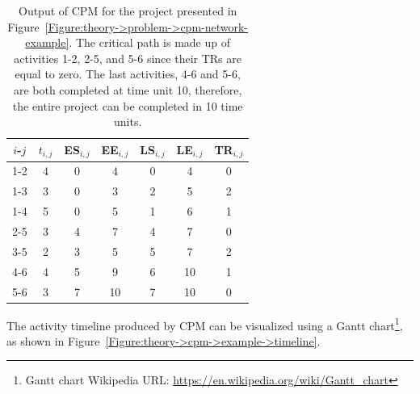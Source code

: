 \begin{table}[ht]
	\centering
	\begin{tabular}{|c|c|c|c|c|c|c|}
		\hline
		$i$-$j$ & $t_{i, j}$ & ES$_{i, j}$ & EE$_{i, j}$ & LS$_{i, j}$ & LE$_{i, j}$ & TR$_{i, j}$ \\ \hline
		  1-2   &     4      &      0      &      4      &      0      &      4      &      0      \\
		  1-3   &     3      &      0      &      3      &      2      &      5      &      2      \\
		  1-4   &     5      &      0      &      5      &      1      &      6      &      1      \\
		  2-5   &     3      &      4      &      7      &      4      &      7      &      0      \\
		  3-5   &     2      &      3      &      5      &      5      &      7      &      2      \\
		  4-6   &     4      &      5      &      9      &      6      &     10      &      1      \\
		  5-6   &     3      &      7      &     10      &      7      &     10      &      0      \\ \hline
	\end{tabular}
	\caption{Output of CPM for the project presented in Figure~\ref{Figure:theory->problem->cpm-network-example}.
		The critical path is made up of activities 1-2, 2-5, and 5-6 since their TRs are equal to zero.
		The last activities, 4-6 and 5-6, are both completed at time unit 10, therefore, the entire project can be completed in 10 time units.
	}
	\label{Table:theory->cpm->exmaple->data}
\end{table}

The activity timeline produced by CPM can be visualized using a Gantt chart\footnote{Gantt chart Wikipedia URL: \url{https://en.wikipedia.org/wiki/Gantt_chart}}, as shown in Figure~\ref{Figure:theory->cpm->example->timeline}.

